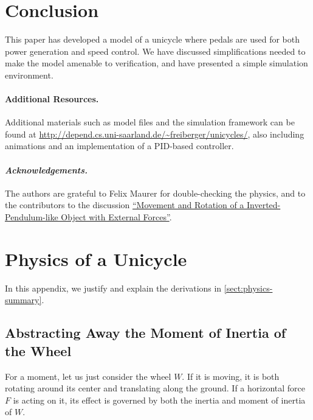 \documentclass[copyright,submission]{eptcs}
\begin{document}
\section{Conclusion}\label{sect:conclusion}
This paper has developed a model of a unicycle where pedals are used
for both power generation and speed control. We have discussed
simplifications needed to make the model amenable to verification, and
have presented a simple simulation environment.

\paragraph{Additional Resources.} Additional materials such as model files and the simulation framework can be found at \mbox{\url{http://depend.cs.uni-saarland.de/~freiberger/unicycles/}}, also including animations and an implementation of a PID-based controller.

\paragraph{\textit{Acknowledgements.}} The authors are grateful to  Felix Maurer for  double-checking the physics, and to the contributors to the discussion \href{http://physics.stackexchange.com/questions/179622/movement-and-rotation-of-a-inverted-pendulum-like-object-with-external-forces}{``Movement and Rotation of a Inverted-Pendulum-like Object with External Forces''}.






\clearpage\appendix


\section{Physics of a Unicycle}\label{sect:physics}

In this appendix, we justify and explain the derivations in \cref{sect:physics-summary}.


\subsection{Abstracting Away the Moment of Inertia of the Wheel}\label{sect:abstractinginertia}

For a moment, let us just consider the wheel $W$. If it is moving, it is both rotating around its center and translating along the ground. If a horizontal force $F$ is acting on it, its effect is governed by both the inertia and moment of inertia of $W$.
\end{document}
